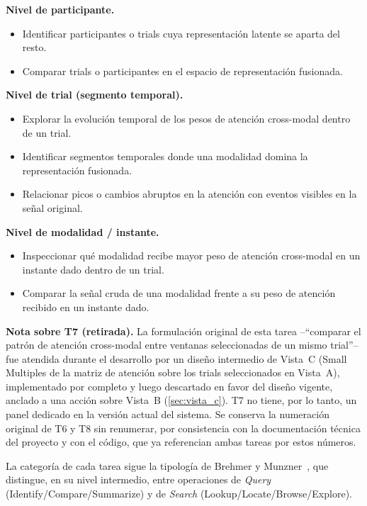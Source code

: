 \textbf{Nivel de participante.}
\begin{itemize}
    \item[\textbf{T1}] Identificar participantes o trials cuya representación latente se aparta del resto.
    \item[\textbf{T2}] Comparar trials o participantes en el espacio de representación fusionada.
\end{itemize}

\textbf{Nivel de trial (segmento temporal).}
\begin{itemize}
    \item[\textbf{T3}] Explorar la evolución temporal de los pesos de atención cross-modal dentro de un trial.
    \item[\textbf{T4}] Identificar segmentos temporales donde una modalidad domina la representación fusionada.
    \item[\textbf{T5}] Relacionar picos o cambios abruptos en la atención con eventos visibles en la señal original.
\end{itemize}

\textbf{Nivel de modalidad / instante.}
\begin{itemize}
    \item[\textbf{T6}] Inspeccionar qué modalidad recibe mayor peso de atención cross-modal en un instante dado dentro de un trial.
    \item[\textbf{T8}] Comparar la señal cruda de una modalidad frente a su peso de atención recibido en un instante dado.
\end{itemize}

\textbf{Nota sobre T7 (retirada).} La formulación original de esta tarea --``comparar el patrón de atención cross-modal entre ventanas seleccionadas de un mismo trial''-- fue atendida durante el desarrollo por un diseño intermedio de Vista~C (Small Multiples de la matriz de atención sobre los trials seleccionados en Vista~A), implementado por completo y luego descartado en favor del diseño vigente, anclado a una acción sobre Vista~B (\cref{sec:vista_c}). T7 no tiene, por lo tanto, un panel dedicado en la versión actual del sistema. Se conserva la numeración original de T6 y T8 sin renumerar, por consistencia con la documentación técnica del proyecto y con el código, que ya referencian ambas tareas por estos números.

La categoría de cada tarea sigue la tipología de Brehmer y Munzner~\cite{brehmer2013multi}, que distingue, en su nivel intermedio, entre operaciones de \emph{Query} (Identify/Compare/Summarize) y de \emph{Search} (Lookup/Locate/Browse/Explore).

